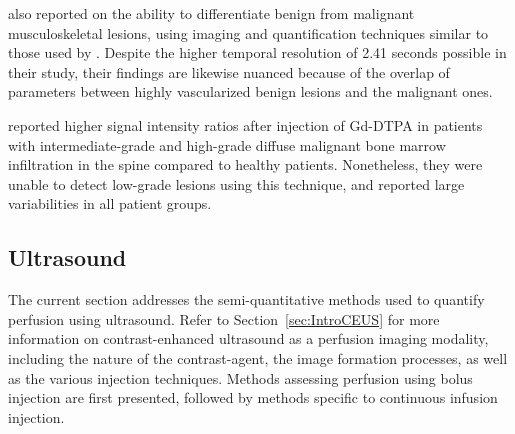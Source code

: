 \citet{Verstraete:1994iw} also reported on the ability to differentiate benign from malignant musculoskeletal lesions, using imaging and quantification techniques similar to those used by \citet{Erlemann:1989ib}.
Despite the higher temporal resolution of 2.41 seconds possible in their study, their findings are likewise nuanced because of the overlap of parameters between highly vascularized benign lesions and the malignant ones. %

\citet{Baur:1997ur} reported higher signal intensity ratios after injection of Gd-DTPA in patients with intermediate-grade and high-grade diffuse malignant bone marrow infiltration in the spine compared to healthy patients.
Nonetheless, they were unable to detect low-grade lesions using this technique, and reported large variabilities in all patient groups. %

\subsection{Ultrasound}
\label{sec:SQCEUS}
The current section addresses the semi-quantitative methods used to quantify perfusion using ultrasound.
Refer to Section~\ref{sec:IntroCEUS} for more information on contrast-enhanced ultrasound as a perfusion imaging modality, including the nature of the contrast-agent, the image formation processes, as well as the various injection techniques.
Methods assessing perfusion using bolus injection are first presented, followed by methods specific to continuous infusion injection.

